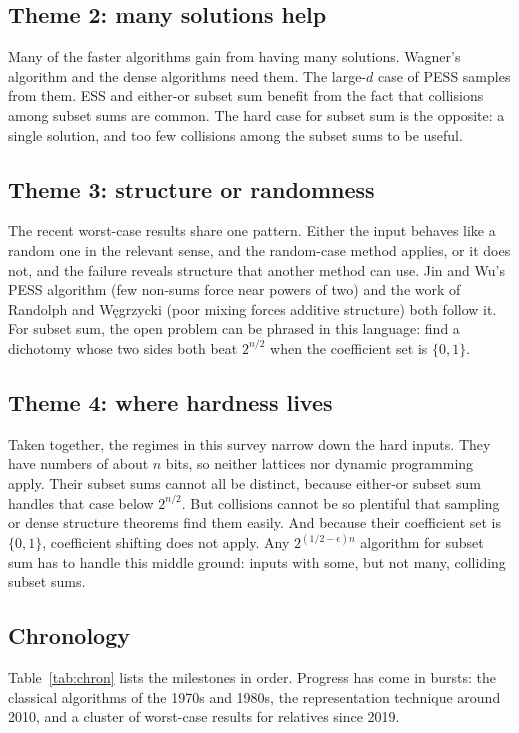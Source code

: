 \documentclass[11pt]{article}
\begin{document}
\subsection{Theme 2: many solutions help}
Many of the faster algorithms gain from having many solutions. Wagner's
algorithm and the dense algorithms need them. The large-$d$ case of PESS
samples from them. ESS and either-or subset sum benefit from the fact that
collisions among subset sums are common. The hard case for subset sum is the
opposite: a single solution, and too few collisions among the subset sums to
be useful.

\subsection{Theme 3: structure or randomness}
The recent worst-case results share one pattern. Either the input behaves like
a random one in the relevant sense, and the random-case method applies, or it
does not, and the failure reveals structure that another method can use. Jin
and Wu's PESS algorithm (few non-sums force near powers of two) and the work
of Randolph and W\k{e}grzycki (poor mixing forces additive structure) both
follow it. For subset sum, the open problem can be phrased in this language:
find a dichotomy whose two sides both beat $2^{n/2}$ when the coefficient set is
$\{0,1\}$.

\subsection{Theme 4: where hardness lives}
Taken together, the regimes in this survey narrow down the hard inputs. They
have numbers of about $n$ bits, so neither lattices nor dynamic programming
apply. Their subset sums cannot all be distinct, because either-or subset sum
handles that case below $2^{n/2}$. But collisions cannot be so plentiful that
sampling or dense structure theorems find them easily. And because their
coefficient set is $\{0,1\}$, coefficient shifting does not apply. Any
$2^{(1/2-\epsilon)n}$ algorithm for subset sum has to handle this middle
ground: inputs with some, but not many, colliding subset sums.

\subsection{Chronology}
Table~\ref{tab:chron} lists the milestones in order. Progress has come in
bursts: the classical algorithms of the 1970s and 1980s, the representation
technique around 2010, and a cluster of worst-case results for relatives since
2019.
\end{document}
